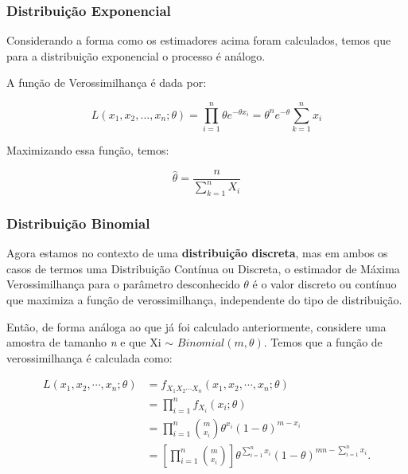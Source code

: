 \subsubsection{Distribuição Exponencial}

Considerando a forma como os estimadores acima foram calculados, temos que para a distribuição exponencial o processo é análogo.

A função de Verossimilhança é dada por:

\begin{equation}
L(x_{1}, x_{2}, ..., x_{n}; \theta) = \prod_{i=1}^{n} \theta e^{-\theta x_{i}} = \theta^{n}e^{-\theta}\sum_{k=1}^{n}x_{i}
\end{equation}

Maximizando essa função, temos:

\begin{equation}
\hat{\theta} = \frac{n}{\sum_{k=1}^{n}X_{i}}
\end{equation}

\subsubsection{Distribuição Binomial}

Agora estamos no contexto de uma \textbf{distribuição discreta}, mas em ambos os casos de termos uma Distribuição Contínua ou Discreta, o estimador de Máxima Verossimilhança para o parâmetro desconhecido \begin{math} \theta \end{math} é o valor discreto ou contínuo que maximiza a função de verossimilhança, independente do tipo de distribuição.

Então, de forma análoga ao que já foi calculado anteriormente, considere uma amostra de tamanho \emph{n} e que 
Xi $\sim$ \begin{math} Binomial(m, \theta) \end{math}. Temos que a função de verossimilhança é calculada como:

\begin{align}
       L(x_1, x_2, \cdots, x_n; \theta)&= f_{X_1 X_2 \cdots X_n}(x_1, x_2, \cdots, x_n; \theta)\\
       &=\prod_{i=1}^{n} f_{X_i}(x_i; \theta)\\
       &=\prod_{i=1}^{n} {m \choose x_i} \theta^{x_i} (1-\theta)^{m-x_i}\\
       &=\left[\prod_{i=1}^{n} {m \choose x_i} \right] \theta^{\sum_{i=1}^n x_i} (1-\theta)^{mn-\sum_{i=1}^n x_i}.
\end{align}

